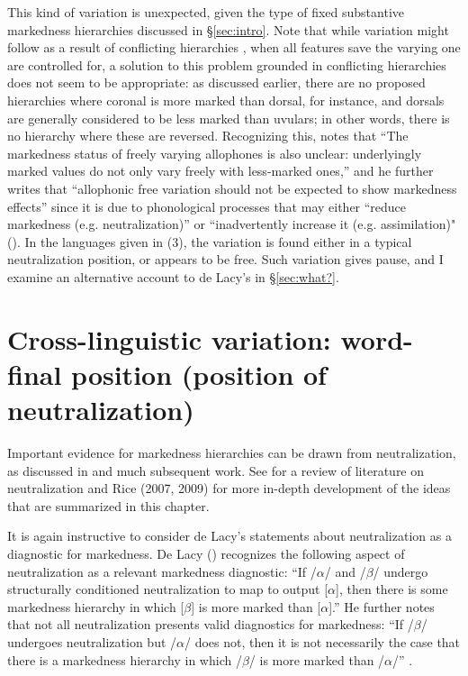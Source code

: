 \documentclass[output=paper]{langsci/langscibook}
\begin{document}
  This kind of variation is unexpected, given the type of fixed substantive markedness hierarchies discussed in \S \ref{sec:intro}. Note that while variation might follow as a result of conflicting hierarchies \citep[344]{DeLacy2006}, when all features save the varying one are controlled for, a solution to this problem grounded in conflicting hierarchies does not seem to be appropriate: as discussed earlier, there are no proposed hierarchies where coronal is more marked than dorsal, for instance, and dorsals are generally considered to be less marked than uvulars; in other words, there is no hierarchy where these are reversed. Recognizing this, \citet[341]{DeLacy2006} notes that “The markedness status of freely varying allophones is also unclear: underlyingly marked values do not only vary freely with less-marked ones,” and he further writes that “allophonic free variation should not be expected to show markedness effects” since it is due to phonological processes that may either “reduce markedness (e.g. neutralization)” or “inadvertently increase it (e.g. assimilation)" (\citeyear[342]{DeLacy2006}). In the languages given in (3), the variation is found either in a typical neutralization position, or appears to be free. Such variation gives pause, and I examine an alternative account to de Lacy’s in \S \ref{sec:what?}. 

\section{Cross-linguistic variation: word-final position (position of neutralization)} \label{sec:word-final}
 \largerpage[-1]
   Important evidence for markedness hierarchies can be drawn from neutralization, as discussed in \citet{Trubetzkoy1969} and much subsequent work. See \citet{Battistella1990} for a review of literature on neutralization and Rice (2007, 2009) for more in-depth development of the ideas that are summarized in this chapter.

It is again instructive to consider de Lacy’s statements about neutralization as a diagnostic for markedness. De Lacy (\citeyear[342]{DeLacy2006}) recognizes the following aspect of neutralization as a relevant markedness diagnostic: “If /$\alpha $/ and /$\beta $/ undergo structurally conditioned neutralization to map to output [$\alpha $], then there is some markedness hierarchy in which [$\beta $] is more marked than [$\alpha $].” He further notes that not all neutralization presents valid diagnostics for markedness: “If /$\beta $/ undergoes neutralization but /$\alpha $/ does not, then it is not necessarily the case that there is a markedness hierarchy in which /$\beta $/ is more marked than /$\alpha $/” \citep[340]{DeLacy2006}. 
\end{document}

